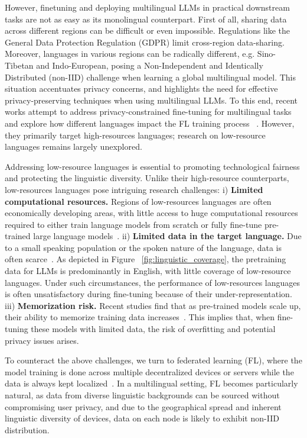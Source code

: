 \documentclass[withindex,glossary]{cam-thesis}
\begin{document}
However, finetuning and deploying multilingual LLMs in practical downstream tasks are not as easy as its monolingual counterpart. First of all, sharing data across different regions can be difficult or even impossible. Regulations like the General Data Protection Regulation (GDPR) \cite{lim2020federated} limit cross-region data-sharing. Moreover, languages in various regions can be radically different, e.g. Sino-Tibetan and Indo-European, posing a Non-Independent and Identically Distributed (non-IID) challenge when learning a global multilingual model.
%
%
This situation accentuates privacy concerns, and highlights the need for effective privacy-preserving techniques when using multilingual LLMs. 
%
To this end, recent works attempt to address privacy-constrained fine-tuning for multilingual tasks and explore how different languages impact the FL training process ~\cite{Weller2022PretrainedMF}. 
%
However, they primarily target high-resources languages; research on low-resource languages remains largely unexplored.


Addressing low-resource languages is essential to promoting technological fairness and protecting the linguistic diversity. Unlike their high-resource counterparts, low-resources languages pose intriguing research challenges: 
%
i) \textbf{Limited computational resources.} Regions of low-resources languages are often economically developing areas, with little access to huge computational resources required to either train language models from scratch or fully fine-tune pre-trained large language models~\citep{mager2021findings,adebara-abdul-mageed-2022-towards}.
ii) \textbf{Limited data in the target language.} Due to a small speaking population or the spoken nature of the language, data is often scarce~\cite{adelani2021masakhaner,muhammad2022naijasenti,ebrahimi-etal-2022-americasnli}. As depicted in Figure ~\ref{fig:linguistic_coverage}, the pretraining data for LLMs is predominantly in English, with little coverage of low-resource languages. Under such circumstances, the performance of low-resources languages is often unsatisfactory during fine-tuning because of their under-representation.
iii) \textbf{Memorization risk.} Recent studies find that as pre-trained models scale up, their ability to memorize training data increases~\cite{tirumala2022memorization}. This implies that, when fine-tuning these models with limited data, the risk of overfitting and potential privacy issues arises.

To counteract the above challenges, we turn to federated learning (FL), where the model training is done across multiple decentralized devices or servers while the data is always kept localized~\cite{fedavg, fedprox, yang2019federated}. In a multilingual setting, FL becomes particularly natural, as data from diverse linguistic backgrounds can be sourced without compromising user privacy, and due to the geographical spread and inherent linguistic diversity of devices, data on each node is likely to exhibit non-IID distribution.
\end{document}
